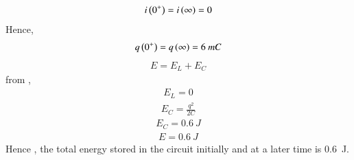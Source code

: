 \documentclass[beamer]{IEEEtran}
\theoremstyle{remark}
\begin{document}
\begin{align}
    i\left(0^{+}\right)=i\left(\infty\right)=0
\end{align}
Hence,
\begin{align}
    q\left(0^{+}\right)=q\left(\infty\right)=6\ mC
\end{align}
\begin{align}
    E=E_L+E_C
\end{align}
from ,
\begin{align}
    E_L=0
\end{align}
\begin{align}
    E_C=\frac{q^2}{2C}
\end{align}
\begin{align}
    E_C=0.6\ J
\end{align}
\begin{align}
    E=0.6\ J
\end{align}
Hence , the total energy stored in the circuit initially and at a later time is 0.6\ J.
\end{document}

